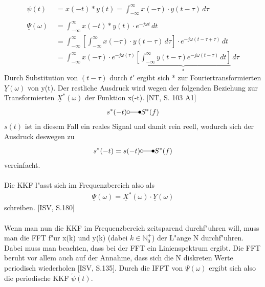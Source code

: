 \begin{align}
\psi(t) \  \; &= x(-t) * y(t) = \int_{-\infty}^{\infty} x(-\tau) \cdot y(t-\tau)\,d\tau\\\\
\underline \Psi(\omega) &=\int_{-\infty}^{\infty} x(-t) * y(t) \cdot e^{-j\omega t} \,dt\\&=\int_{-\infty}^{\infty} \left[ \int_{-\infty}^{\infty} x(-\tau) \cdot y(t-\tau)\,d\tau \right] \cdot e^{-j\omega (t - \tau + \tau)} \,dt\\&=\int_{-\infty}^{\infty} x(-\tau) \cdot e^{-j\omega(\tau)} \underbrace{ \left[ \int_{-\infty}^{\infty} y(t-\tau) e^{-j\omega (t - \tau)} \,dt \right]}_* \,d\tau
\end{align}
Durch Substitution von $(t-\tau)$ durch $t'$ ergibt sich * zur Fouriertransformierten $ \underline{Y}(\omega)$ von y(t). Der restliche Ausdruck wird wegen der folgenden Beziehung zur Transformierten $ \underline{X}^*(\omega)$ der Funktion x(-t). [NT, S. 103 A1]
\begin{align}
s^*(-t) \laplace S^*(f)
\end{align}
$s(t)$ ist in diesem Fall ein reales Signal und damit rein reell, wodurch sich der Ausdruck deswegen zu
\begin{align}
s^*(-t) = s(-t) \laplace S^*(f)
\end{align}
vereinfacht.\\\\
Die KKF l"asst sich im Frequenzbereich also als
\begin{align}
\boxed{\underline \Psi(\omega) = \underline{X}^*(\omega) \cdot \underline{Y}(\omega)}
\end{align}
schreiben. [ISV, S.180]
\\\\
Wenn man nun die KKF im Frequenzbereich zeitsparend durchf"uhren will, muss man die FFT f"ur x(k) und y(k) (dabei $k \in \mathbb{N}^+_0$) der L"ange N durchf"uhren. Dabei muss man beachten, dass bei der FFT ein Linienspektrum ergibt. Die FFT beruht vor allem auch auf der Annahme, dass sich die N diskreten Werte periodisch wiederholen [ISV, S.135]. Durch die IFFT von $ \underline \Psi(\omega)$ ergibt sich also die periodische KKF $\tilde{\psi}(t)$.

